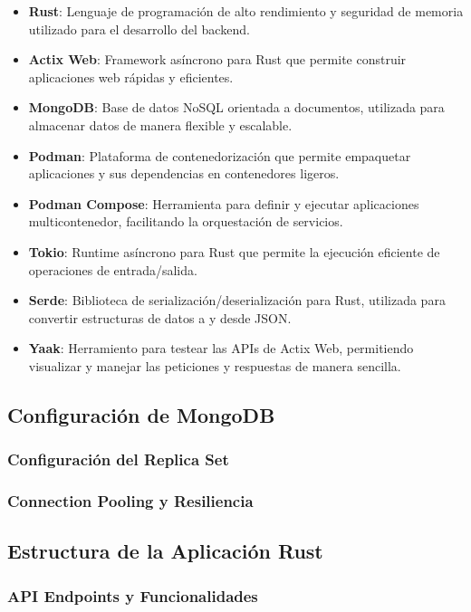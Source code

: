 \documentclass[12pt,letterpaper]{article}
\begin{document}
\begin{itemize}
    \item \textbf{Rust}: Lenguaje de programación de alto rendimiento y seguridad de memoria utilizado para el desarrollo del backend.
    \item \textbf{Actix Web}: Framework asíncrono para Rust que permite construir aplicaciones web rápidas y eficientes.
    \item \textbf{MongoDB}: Base de datos NoSQL orientada a documentos, utilizada para almacenar datos de manera flexible y escalable.
    \item \textbf{Podman}: Plataforma de contenedorización que permite empaquetar aplicaciones y sus dependencias en contenedores ligeros.
    \item \textbf{Podman Compose}: Herramienta para definir y ejecutar aplicaciones multicontenedor, facilitando la orquestación de servicios.
    \item \textbf{Tokio}: Runtime asíncrono para Rust que permite la ejecución eficiente de operaciones de entrada/salida.
    \item \textbf{Serde}: Biblioteca de serialización/deserialización para Rust, utilizada para convertir estructuras de datos a y desde JSON.
    \item \textbf{Yaak}: Herramiento para testear las APIs de Actix Web, permitiendo visualizar y manejar las peticiones y respuestas de manera sencilla.

\end{itemize}

\subsection{Configuración de MongoDB}
\subsubsection{Configuración del Replica Set}
\subsubsection{Connection Pooling y Resiliencia}

\subsection{Estructura de la Aplicación Rust}
\subsubsection{API Endpoints y Funcionalidades}
\end{document}
